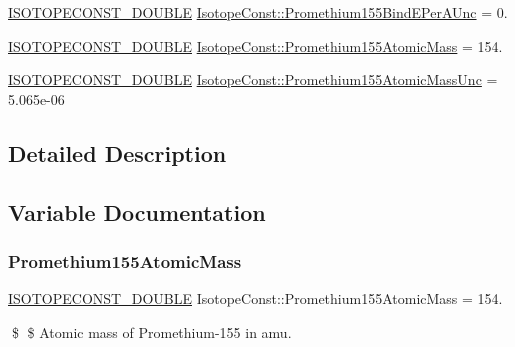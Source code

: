 \begin{DoxyCompactItemize}
\item 
\mbox{\hyperlink{group___isotope_const-_macros_ga8f45a7272ce02c0b4c65c44636ed719a}{I\+S\+O\+T\+O\+P\+E\+C\+O\+N\+S\+T\+\_\+\+D\+O\+U\+B\+LE}} \mbox{\hyperlink{group___isotope_const-_promethium-_pm155_gaa87f1bd606f85ad8a85287db6acda291}{Isotope\+Const\+::\+Promethium155\+Bind\+E\+Per\+A\+Unc}} = 0.
\item 
\mbox{\hyperlink{group___isotope_const-_macros_ga8f45a7272ce02c0b4c65c44636ed719a}{I\+S\+O\+T\+O\+P\+E\+C\+O\+N\+S\+T\+\_\+\+D\+O\+U\+B\+LE}} \mbox{\hyperlink{group___isotope_const-_promethium-_pm155_gad623f6d3fb912b546064fa93046d7fd4}{Isotope\+Const\+::\+Promethium155\+Atomic\+Mass}} = 154.
\item 
\mbox{\hyperlink{group___isotope_const-_macros_ga8f45a7272ce02c0b4c65c44636ed719a}{I\+S\+O\+T\+O\+P\+E\+C\+O\+N\+S\+T\+\_\+\+D\+O\+U\+B\+LE}} \mbox{\hyperlink{group___isotope_const-_promethium-_pm155_ga8f542ef12ca79706db122bb1fc3de7f9}{Isotope\+Const\+::\+Promethium155\+Atomic\+Mass\+Unc}} = 5.\+065e-\/06
\end{DoxyCompactItemize}


\subsection{Detailed Description}


\subsection{Variable Documentation}
\mbox{\label{group___isotope_const-_promethium-_pm155_gad623f6d3fb912b546064fa93046d7fd4}} 
\subsubsection{\texorpdfstring{Promethium155\+Atomic\+Mass}{Promethium155AtomicMass}}
{\footnotesize\ttfamily \mbox{\hyperlink{group___isotope_const-_macros_ga8f45a7272ce02c0b4c65c44636ed719a}{I\+S\+O\+T\+O\+P\+E\+C\+O\+N\+S\+T\+\_\+\+D\+O\+U\+B\+LE}} Isotope\+Const\+::\+Promethium155\+Atomic\+Mass = 154.}

\$ \$ Atomic mass of Promethium-\/155 in amu. \mbox{\label{group___isotope_const-_promethium-_pm155_ga8f542ef12ca79706db122bb1fc3de7f9}} 
